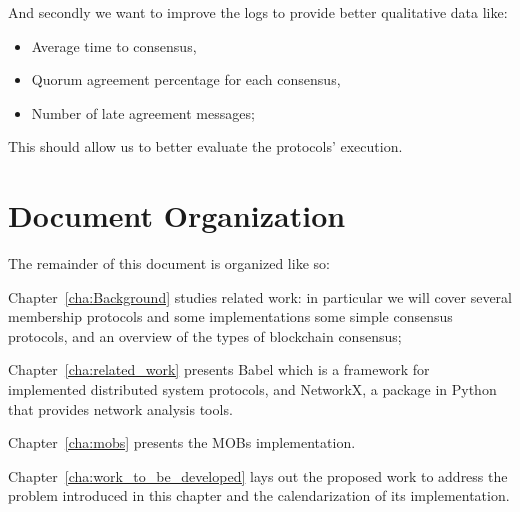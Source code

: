 And secondly we want to improve the logs to provide better qualitative data like:
\begin{itemize}
  \item Average time to consensus,
  \item Quorum agreement percentage for each consensus,
  \item Number of late agreement messages;
\end{itemize}
This should allow us to better evaluate the protocols' execution.

\section{Document Organization}\label{sub:document_organization}

The remainder of this document is organized like so:

Chapter~\ref{cha:Background} studies related work: in particular we will cover several membership protocols and some implementations
some simple consensus protocols, and an overview of the types of blockchain consensus;


Chapter~\ref{cha:related_work} presents Babel which is a framework for implemented distributed system protocols, and NetworkX,
a package in Python that provides network analysis tools.

Chapter~\ref{cha:mobs} presents the MOBs implementation.

Chapter~\ref{cha:work_to_be_developed} lays out the proposed work to address the problem
introduced in this chapter and the calendarization of its implementation.